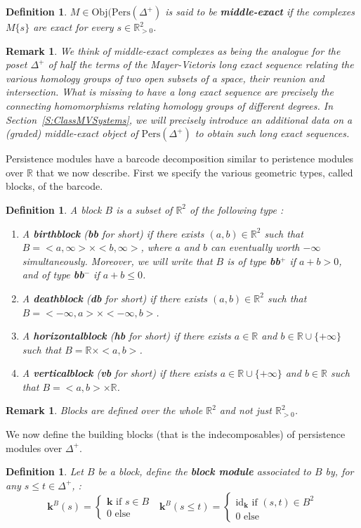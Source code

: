 \documentclass[a4paper, english, 11pt]{article}
\newcommand{\kk}[0]{\textbf{k}}
\newcommand{\0}{\vec{0}}
\newcommand{\R}[0]{\mathbb{R}}
\newcommand{\Obj}[0]{\text{Obj}}
\newcommand{\Pers}[0]{\text{Pers}}
\newtheorem{remark}[prop]{Remark}
\newtheorem{defi}[prop]{Definition}
\begin{document}
\begin{defi}\label{D:middleexact}
$M\in \Obj(\Pers(\Delta^+)$ is said to be \textbf{middle-exact} if the complexes $M\{s\}$ are exact for every $s\in\R^2_{>0} $.
\end{defi}
\begin{remark}
We think of middle-exact complexes as being the analogue for the poset $\Delta^+$ of half the terms of the Mayer-Vietoris long exact sequence relating the various homology groups of two open subsets of a space, their reunion and intersection. What is missing to have a long exact sequence are precisely the connecting homomorphisms relating homology groups of different degrees. In Section~\ref{S:ClassMVSystems}, we will precisely introduce an additional data on a (graded) middle-exact object of $\Pers(\Delta^+)$ to obtain such long exact sequences. 
\end{remark}
Persistence modules have a barcode decomposition similar to peristence modules over $\R$ that we now describe. First we specify the various geometric types, called blocks, of the barcode. 
\begin{defi}\label{def:block_MV}
A block $B$ is a subset of $\R^2$ of the following type : 
\begin{enumerate}
    \item A \textbf{birthblock} (\textbf{bb} for short) if there exists $(a,b)\in \R^2$ such that $B = <a,\infty> \times <b,\infty>$, where $a$ and $b$ can eventually worth $-\infty$ simultaneously. Moreover, we will write that $B$ is of type \textbf{bb$^+$} if $a+b > 0$, and of type \textbf{bb$^-$} if $a+b \leq 0$. 
    \item A \textbf{deathblock} (\textbf{db} for short) if there exists $(a,b)\in \R^2$ such that $B = <-\infty,a> \times <-\infty,b>$.
     \item A \textbf{horizontalblock} (\textbf{hb} for short) if there exists $a\in \R$ and $b\in \R\cup \{+\infty\}$ such that $B = \R \times <a,b>$.
     \item A \textbf{verticalblock} (\textbf{vb} for short) if there exists $a\in \R\cup \{+\infty\}$ and $b\in \R$ such that $B = <a,b> \times \R$.
\end{enumerate}
\end{defi}
\begin{remark}
Blocks are defined over the whole $\R^2$ and not just $\R^2_{>0}$.
\end{remark}
We now define the building blocks (that is the indecomposables) of persistence modules over $\Delta^+$.
\begin{defi}\label{Def:blockmodule}
Let $B$ be a block, define the \textbf{block module} associated to $B$ by, for any $s\leq t \in \Delta^+$, : 
$$\kk^B(s) = \begin{cases} \kk \text{~if~}s\in B \\ 0 \text{~else}
\end{cases} ~~~\kk^B(s\leq t) = \begin{cases} \text{id}_\kk \text{~if~} (s,t)\in B^2 \\ 0 \text{~else} \end{cases} $$
\end{defi}
\end{document}
